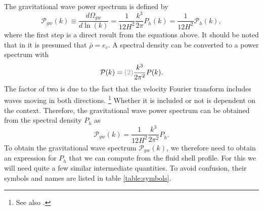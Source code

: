 The gravitational wave power spectrum is defined by
\cite[eq. 3.45]{hindmarsh_gw_pt_2019}
\begin{equation}
\mathcal{P}_{gw}(k)
\equiv \frac{d \Omega_{gw}}{d \ln (k)}
= \frac{1}{12 H^2} \frac{k^3}{2\pi} P_{\dot{h}}(k)
= \frac{1}{12 H^2} \mathcal{P}_{\dot{h}}(k),
\label{eq:gw_pow_spec}
\end{equation}
where the first step is a direct result from the equations above.
It should be noted that in \cite[eq. 3.6, eq. 3.46]{hindmarsh_gw_pt_2019} it is presumed that $\bar{\rho}=e_c$.
A spectral density can be converted to a power spectrum with
\cite[eq. 4.18]{hindmarsh_gw_pt_2019}
\begin{equation}
\mathcal{P}(k) = \textcolor{gray}{(2)} \frac{k^3}{2 \pi^2} P(k).
\label{eq:pow_spec}
\end{equation}
The factor of two is due to the fact that the velocity Fourier transform includes waves moving in both directions.%
\footnote{See also \cite[p. 338]{maggiore_gw_2008}.}
Whether it is included or not is dependent on the context.
Therefore, the gravitational wave power spectrum can be obtained from the spectral density $P_{\dot{h}}$ as
\begin{equation}
\mathcal{P}_{gw}(k) = \frac{1}{12 H^2} \frac{k^3}{2\pi^2} P_{\dot{h}}.
\label{eq:gw_pow_spec2}
\end{equation}
To obtain the gravitational wave spectrum $\mathcal{P}_{gw}(k)$,
we therefore need to obtain an expression for $P_{\dot{h}}$ that we can compute from the fluid shell profile.
For this we will need quite a few similar intermediate quantities.
To avoid confusion, their symbols and names are listed in table \ref{table:symbols}.

